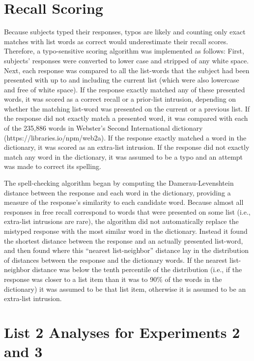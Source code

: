 \documentclass[man,natbib,floatsintext]{apa6} %
\begin{document}
\section{Recall Scoring}
Because subjects typed their responses, typos are likely and counting only exact matches with list words as correct would underestimate their recall scores. Therefore, a typo-sensitive scoring algorithm was implemented as follows: First, subjects' responses were converted to lower case and stripped of any white space. Next, each response was compared to all the list-words that the subject had been presented with up to and including the current list (which were also lowercase and free of white space). If the response exactly matched any of these presented words, it was scored as a correct recall or a prior-list intrusion, depending on whether the matching list-word was presented on the current or a previous list. If the response did not exactly match a presented word, it was compared with each of the 235,886 words in Webster's Second International dictionary (https://libraries.io/npm/web2a). If the response exactly matched a word in the dictionary, it was scored as an extra-list intrusion. If the response did not exactly match any word in the dictionary, it was assumed to be a typo and an attempt was made to correct its spelling.

The spell-checking algorithm began by computing the Damerau-Levenshtein distance \citep{Dame64} between the response and each word in the dictionary, providing a measure of the response's similarity to each candidate word. Because almost all responses in free recall correspond to words that were presented on some list (i.e., extra-list intrusions are rare), the algorithm did not automatically replace the mistyped response with the most similar word in the dictionary. Instead it found the shortest distance between the response and an actually presented list-word, and then found where this ``nearest list-neighbor'' distance lay in the distribution of distances between the response and the dictionary words. If the nearest list-neighbor distance was below the tenth percentile of the distribution (i.e., if the response was closer to a list item than it was to 90\% of the words in the dictionary) it was assumed to be that list item, otherwise it is assumed to be an extra-list intrusion.



\section{List 2 Analyses for Experiments 2 and 3}
\end{document}
